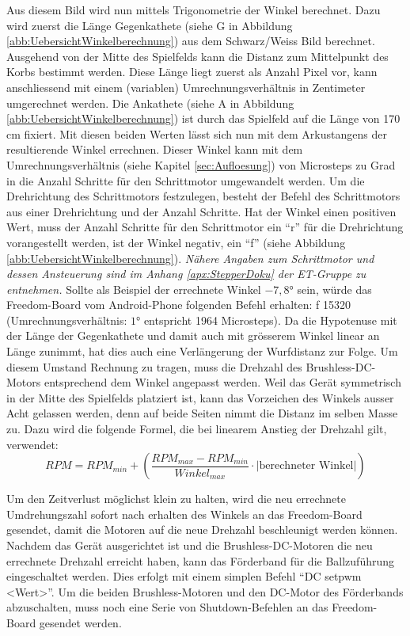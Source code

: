 Aus diesem Bild wird nun mittels Trigonometrie der Winkel berechnet. 
Dazu wird zuerst die Länge Gegenkathete (siehe G in Abbildung \ref{abb:UebersichtWinkelberechnung}) 
aus dem Schwarz/Weiss Bild berechnet. Ausgehend von der Mitte des Spielfelds kann die Distanz zum Mittelpunkt des 
Korbs bestimmt werden. Diese Länge liegt zuerst als Anzahl Pixel vor, 
kann anschliessend mit einem (variablen) Umrechnungsverhältnis in Zentimeter umgerechnet werden.
Die Ankathete (siehe A in Abbildung \ref{abb:UebersichtWinkelberechnung}) ist durch das Spielfeld auf die Länge von 170 cm fixiert.
Mit diesen beiden Werten lässt sich nun mit dem Arkustangens der resultierende Winkel errechnen.
Dieser Winkel kann mit dem Umrechnungsverhältnis (siehe Kapitel \ref{sec:Aufloesung}) von Microsteps zu Grad 
in die Anzahl Schritte für den Schrittmotor umgewandelt werden. Um die Drehrichtung des Schrittmotors festzulegen, besteht der 
Befehl des Schrittmotors aus einer Drehrichtung und der Anzahl Schritte. Hat der Winkel einen positiven Wert, muss der Anzahl 
Schritte für den Schrittmotor ein  \enquote{r} für die Drehrichtung vorangestellt werden, ist der Winkel negativ, ein  \enquote{f} 
(siehe Abbildung \ref{abb:UebersichtWinkelberechnung}).  
\newline
\newline
\textit{Nähere Angaben zum Schrittmotor und dessen Ansteuerung sind im Anhang \ref{apx:StepperDoku} der ET-Gruppe zu entnehmen.}
\newline
\newline
Sollte als Beispiel der errechnete Winkel $-7,8\si{\degree}$ sein, würde das Freedom-Board vom Android-Phone folgenden 
Befehl erhalten: f 15320 (Umrechnungsverhältnis: $1\si{\degree}$ entspricht 1964 Microsteps).
Da die Hypotenuse mit der Länge der Gegenkathete und damit auch mit grösserem Winkel linear an Länge zunimmt, 
hat dies auch eine Verlängerung der Wurfdistanz zur Folge. Um diesem Umstand Rechnung zu tragen, muss die Drehzahl des 
Brushless-DC-Motors entsprechend dem Winkel angepasst werden. Weil das Gerät symmetrisch in der Mitte des Spielfelds platziert ist, 
kann das Vorzeichen des Winkels ausser Acht gelassen werden, denn auf beide Seiten nimmt die Distanz im selben Masse zu.
Dazu wird die folgende Formel, die bei linearem Anstieg der Drehzahl gilt, verwendet:
\begin{equation}
RPM = RPM_{min} +  \left( \frac{RPM_{max} -RPM_{min}}{Winkel_{max}} \cdot |\text{berechneter Winkel}| \right)
\end{equation}
 
Um den Zeitverlust möglichst klein zu halten, wird die neu errechnete Umdrehungszahl sofort nach erhalten des Winkels an das 
Freedom-Board gesendet, damit die Motoren auf die neue Drehzahl beschleunigt werden können.
Nachdem das Gerät ausgerichtet ist und die Brushless-DC-Motoren die neu errechnete Drehzahl erreicht haben, kann das Förderband 
für die Ballzuführung eingeschaltet werden. Dies erfolgt mit einem simplen Befehl \enquote{DC setpwm <Wert>}. 
Um die beiden Brushless-Motoren und den DC-Motor des Förderbands abzuschalten, muss noch eine Serie von Shutdown-Befehlen an das 
Freedom-Board gesendet werden. 


            
            
